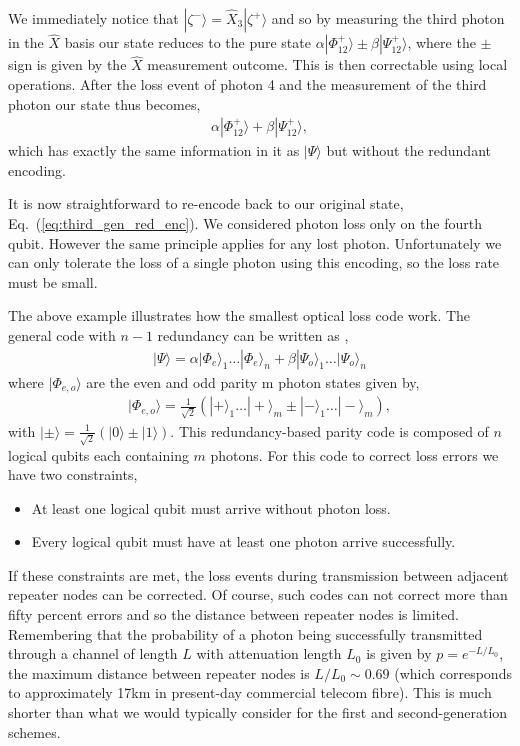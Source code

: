 We immediately notice that \mbox{$|\zeta^-\rangle=\hat{X}_3 |\zeta^+\rangle$} and so by measuring the third photon in the $\hat{X}$ basis our state reduces to the pure state \mbox{$\alpha |\Phi_{12}^+\rangle \pm \beta |\Psi_{12}^+\rangle$}, where the $\pm$ sign is given by the $\hat{X}$ measurement outcome. This is then correctable using local operations. After the loss event of photon 4 and the measurement of the third photon our state thus becomes,
\begin{align}
\alpha |\Phi_{12}^+\rangle + \beta  |\Psi_{12}^+\rangle,
\end{align}
which has exactly the same information in it as $|\Psi\rangle$ but without the redundant encoding.

It is now straightforward to re-encode back to our original state, Eq.~(\ref{eq:third_gen_red_enc}). We considered photon loss only on the fourth qubit. However the same principle applies for any lost photon. Unfortunately we can only tolerate the loss of a single photon using this encoding, so the loss rate must be small.

The above example illustrates how the smallest optical loss code work. The general code with \mbox{$n - 1$} redundancy can be written as \cite{bib:ralph05, bib:munro12},
\begin{align}
|\Psi\rangle = \alpha |\Phi_{e}\rangle_1 \ldots  |\Phi_{{e}}\rangle_n+\beta |\Psi_{o}\rangle_1 \ldots  |\Psi_{o}\rangle_n
\end{align}
where $|\Phi_{e,o}\rangle$ are the even and odd parity m photon states given by,
\begin{align}
|\Phi_{e,o}\rangle = \frac{1}{\sqrt{2}}(|+\rangle_1 \ldots  |+\rangle_m\pm |-\rangle_1 \ldots  |-\rangle_m),
\end{align}
with \mbox{$|\pm\rangle=\frac{1}{\sqrt{2}}(|0\rangle\pm |1\rangle)$}. This redundancy-based parity code is composed of $n$ logical qubits each containing $m$ photons. For this code to correct loss errors we have two constraints,
\begin{itemize}
\item At least one logical qubit must arrive without photon loss.
\item Every logical qubit must have at least one photon arrive successfully.
\end{itemize}
If these constraints are met, the loss events during transmission between adjacent repeater nodes can be corrected. Of course, such codes can not correct more than fifty percent errors and so the distance between repeater nodes is limited. Remembering that the probability of a photon being successfully transmitted through a channel of length $L$ with attenuation length $L_0$ is given by \mbox{$p=e^{-L/L_0}$}, the maximum distance between repeater nodes is \mbox{$L/L_0\sim 0.69$} (which corresponds to approximately 17km in present-day commercial telecom fibre). This is much shorter than what we would typically consider for the first and second-generation schemes.

